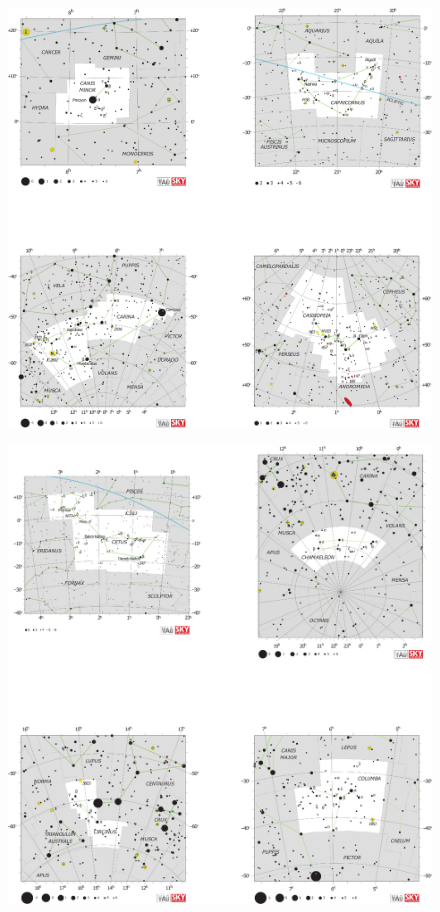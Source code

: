 \documentclass[a4paper,12pt]{extarticle}
\begin{document}
\clearpage
\begin{figure}
    \centering
    \includegraphics[width=\linewidth]{C5.eps}
\end{figure}
\clearpage
\begin{figure}
    \centering
    \includegraphics[width=\linewidth]{C6.eps}
\end{figure}
\end{document}
